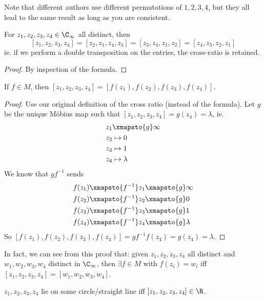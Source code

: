 \documentclass[a4paper]{article}
\begin{document}
Note that different authors use different permutations of $1, 2, 3, 4$, but they all lead to the same result as long as you are consistent.

\begin{lemma}
  For $z_1, z_2, z_3, z_4\in \C_\infty$ all distinct, then
  \[
    [z_1, z_2, z_3, z_4] = [z_2, z_1, z_4, z_3] = [z_3, z_4, z_1, z_2] = [z_4, z_3, z_2, z_1]
  \]
  ie. if we perform a double transposition on the entries, the cross-ratio is retained.
\end{lemma}

\begin{proof}
  By inspection of the formula.
\end{proof}

\begin{prop}
  If $f\in M$, then $[z_1, z_2, z_3, z_4] = [f(z_1), f(z_2), f(z_3), f(z_4)]$.
\end{prop}

\begin{proof}
  Use our original definition of the cross ratio (instead of the formula). Let $g$ be the unique M\"obius map such that $[z_1, z_2, z_3, z_4] = g(z_4) = \lambda$, ie.
  \begin{align*}
    z_1 &\xmapsto{g} \infty\\
    z_2 &\mapsto 0\\
    z_3 &\mapsto 1\\
    z_4 &\mapsto \lambda
  \end{align*}
  We know that $gf^{-1}$ sends
  \begin{align*}
    f(z_1)\xmapsto{f^{-1}} z_1 &\xmapsto{g} \infty\\
    f(z_2)\xmapsto{f^{-1}} z_2 &\xmapsto{g} 0\\
    f(z_3)\xmapsto{f^{-1}} z_3 &\xmapsto{g} 1\\
    f(z_4)\xmapsto{f^{-1}} z_4 &\xmapsto{g} \lambda
  \end{align*}
  So $[f(z_1), f(z_2), f(z_3), f(z_4)] = gf^{-1}f(z_4) = g(z_4) = \lambda$.
\end{proof}

In fact, we can see from this proof that: given $z_1, z_2, z_3, z_4$ all distinct and $w_1, w_2, w_3, w_4$ distinct in $\C_\infty$, then $\exists f\in M$ with $f(z_i) = w_i$ iff $[z_1, z_2, z_3, z_4] = [w_1, w_2, w_3, w_4]$.

\begin{cor}
  $z_1, z_2, z_3, z_4$ lie on some circle/straight line iff $[z_1, z_2, z_3, z_4]\in \R$.
\end{cor}
\end{document}

